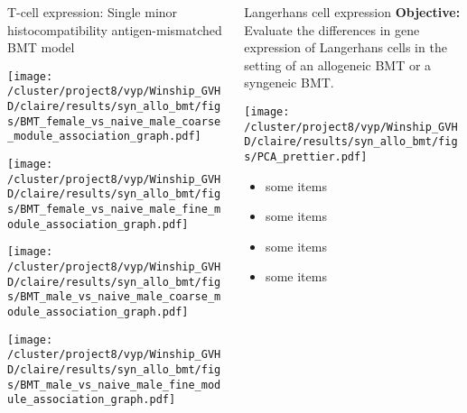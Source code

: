 \documentclass[final,hyperref={pdfpagelabels=false}]{beamer}
\begin{document}
\begin{frame}{}
\begin{columns}[t]
\begin{column}{.25\linewidth}
\begin{block}{T-cell expression: Single minor histocompatibility antigen-mismatched BMT model}
\begin{minipage}{0.45\textwidth}
          \end{minipage}
          \begin{minipage}{0.45\textwidth}
            \texttt{[image: /cluster/project8/vyp/Winship\_GVHD/claire/results/syn\_allo\_bmt/figs/BMT\_female\_vs\_naive\_male\_coarse\_module\_association\_graph.pdf]}
          \end{minipage}
	  \begin{minipage}{0.45\textwidth}
            \texttt{[image: /cluster/project8/vyp/Winship\_GVHD/claire/results/syn\_allo\_bmt/figs/BMT\_female\_vs\_naive\_male\_fine\_module\_association\_graph.pdf]}
          \end{minipage}
          \begin{minipage}{0.45\textwidth}
            \texttt{[image: /cluster/project8/vyp/Winship\_GVHD/claire/results/syn\_allo\_bmt/figs/BMT\_male\_vs\_naive\_male\_coarse\_module\_association\_graph.pdf]}
          \end{minipage}
	  \begin{minipage}{0.45\textwidth}
            \texttt{[image: /cluster/project8/vyp/Winship\_GVHD/claire/results/syn\_allo\_bmt/figs/BMT\_male\_vs\_naive\_male\_fine\_module\_association\_graph.pdf]}
          \end{minipage}
        \end{block}
      \end{column}


      \begin{column}{.25\linewidth}
        \begin{block}{Langerhans cell expression}
	  {\bf Objective:} Evaluate the differences in gene expression of Langerhans cells in the setting of an allogeneic BMT or a syngeneic BMT.
           \begin{center}
           \texttt{[image: /cluster/project8/vyp/Winship\_GVHD/claire/results/syn\_allo\_bmt/figs/PCA\_prettier.pdf]}
          \end{center}

          \begin{itemize}
          \item some items
          \item some items
          \item some items
          \item some items
          \end{itemize}
        \end{block}
      \end{column}


    \end{columns}
  \end{frame}
\end{document}
